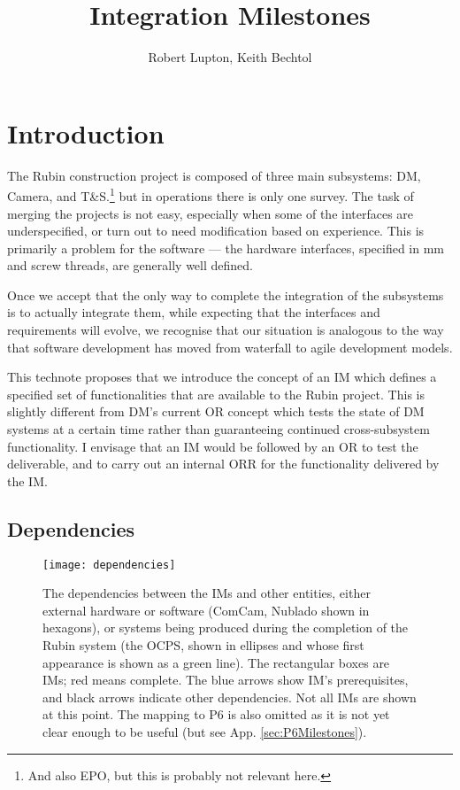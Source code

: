 \documentclass[SE,authoryear,toc]{lsstdoc}
\title{Integration Milestones}
\author{%
Robert Lupton, Keith Bechtol
}
\date{\vcsDate}
\begin{document}
\maketitle

\section{Introduction}

The Rubin construction project is composed of three main subsystems: DM, Camera, and T\&S.\footnote{
  And also EPO, but this is probably not relevant here.}
but in operations there is only one survey.  The task of merging the projects is not easy, especially
when some of the interfaces are underspecified, or turn out to need modification based on experience.
This is primarily
a problem for the software --- the hardware interfaces, specified in mm and screw threads, are generally
well defined.

Once we accept that the only way to complete the integration of the subsystems is to actually integrate them,
while expecting that the interfaces and requirements will evolve, we recognise that our
situation is analogous to the
way that software development has moved from waterfall to agile development models.

This technote proposes that we introduce the concept of an \gls{IM} which defines
a specified set of functionalities that are available to the Rubin project.
This is slightly different from \gls{DM}'s
current \gls{OR} concept which tests the state of DM systems at a certain time rather than guaranteeing
continued cross-subsystem functionality.  I envisage that an \gls{IM} would be followed by an \gls{OR} to test
the deliverable, and to carry out an internal \gls{ORR} for the functionality delivered by the \gls{IM}.

\subsection{Dependencies}

\begin{figure}
\begin{center}
  \hspace*{-0.15\textwidth}\texttt{[image: dependencies]}
\end{center}
\caption{
  The dependencies between the IMs and other entities, either external hardware or software
  (\eg ComCam, Nublado shown in hexagons), or systems being produced during the completion
  of the Rubin system (\eg the \gls{OCPS}, shown in ellipses and whose first appearance
  is shown as a green line).
  The rectangular boxes are IMs; red means complete.  The blue arrows show IM's prerequisites,
  and black arrows indicate other dependencies.
  \hfil\break
  Not all IMs are shown at this point.  The mapping to P6 is also omitted as it is not
  yet clear enough to be useful (but see App. \ref{sec:P6Milestones}).
}
\label{fig:dependencies}
\end{figure}
\end{document}
